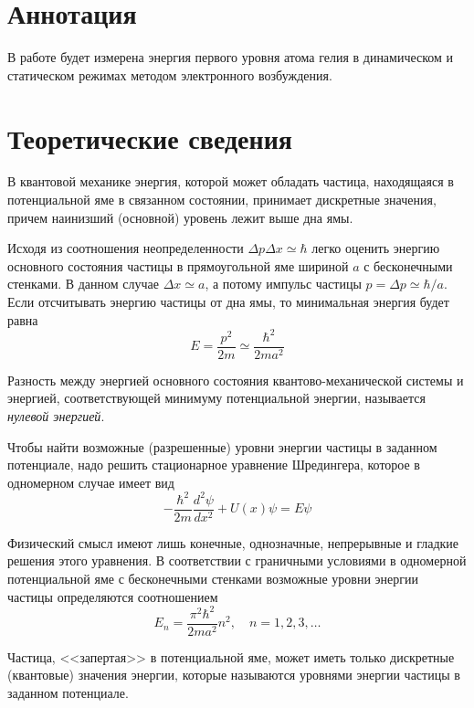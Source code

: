 \documentclass[a4paper, 12pt]{article}
\begin{document}

\section{Аннотация}
В работе будет измерена энергия первого уровня атома гелия в
динамическом и статическом режимах методом электронного возбуждения.





\section{Теоретические сведения}
В квантовой механике энергия, которой может обладать частица,
находящаяся в потенциальной яме в связанном состоянии, принимает
дискретные значения, причем наинизший (основной) уровень лежит выше
дна ямы. 

Исходя из соотношения неопределенности $\Delta p \Delta x \simeq
\hbar$ легко оценить энергию основного состояния частицы в
прямоугольной яме шириной $a$ с бесконечными стенками. В данном случае
$\Delta x \simeq a$, а потому импульс частицы $p = \Delta p \simeq
\hbar/ a$. Если отсчитывать энергию частицы от дна ямы, то минимальная
энергия будет равна
\begin{equation}
    E = \frac{p^2}{2m} \simeq \frac{\hbar^2}{2 m a^2}
    \label{eq:1}
\end{equation}

Разность между энергией основного состояния квантово-механической
системы и энергией, соответствующей минимуму потенциальной энергии,
называется \emph{нулевой энергией}. 

Чтобы найти возможные (разрешенные) уровни энергии частицы в заданном
потенциале, надо решить стационарное уравнение Шредингера, которое в
одномерном случае имеет вид
\begin{equation}
    - \frac{\hbar^2}{2m} \frac{d^2 \psi}{dx^2} + U(x)\psi = E \psi
    \label{eq:2}
\end{equation}

Физический смысл имеют лишь конечные, однозначные, непрерывные и
гладкие решения этого уравнения. В соответствии с граничными условиями
в одномерной потенциальной яме с бесконечными стенками возможные
уровни энергии частицы определяются соотношением
\begin{equation}
    E_n = \frac{\pi^2 \hbar^2}{2ma^2} n^2, \quad n =1,2,3,\ldots
    \label{eq:3}
\end{equation}

Частица, <<запертая>> в потенциальной яме, может иметь только
дискретные (квантовые) значения энергии, которые называются уровнями
энергии частицы в заданном потенциале.
\end{document}
